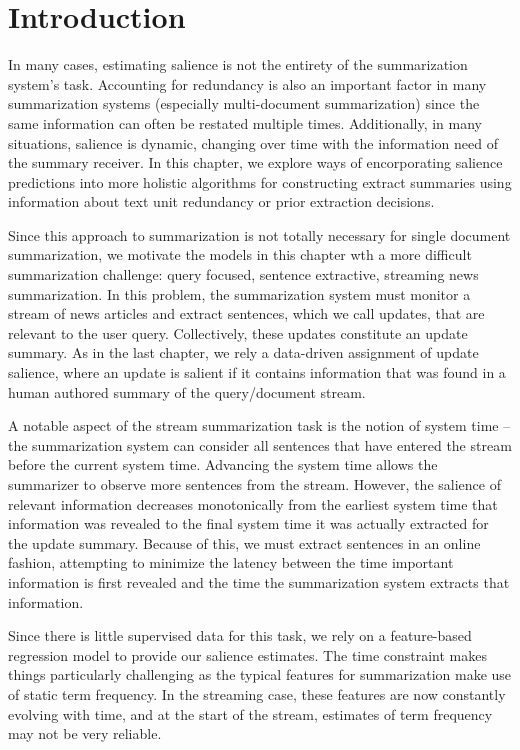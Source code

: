 \section{Introduction}

In many cases, estimating salience is not the entirety of the summarization
system's task. Accounting for redundancy is also an important factor in many
summarization systems (especially multi-document summarization) since the same
information can often be restated multiple times. Additionally, in many
situations, salience is dynamic, changing over time with the information need
of the summary receiver.  In this chapter, we explore ways of encorporating
salience predictions into more holistic algorithms for constructing extract
summaries using information about text unit redundancy or prior extraction
decisions.  

Since this approach to summarization is not totally necessary for single
document summarization, we motivate the models in this chapter wth a more
difficult summarization challenge: query focused, sentence extractive,
streaming news summarization.  In this problem, the summarization system must
monitor a stream of news articles and extract sentences, which we call
updates, that are relevant to the user query. Collectively, these updates
constitute an update summary.  As in the last chapter, we rely a data-driven
assignment of update salience, where an update is salient if it contains
information that was found in a human authored summary of the query/document
stream. 

A notable aspect of the stream summarization task is the notion of system time
-- the summarization system can consider all sentences that have entered the
stream before the current system time. Advancing the system time allows the
summarizer to observe more sentences from the stream. However, the salience of
relevant information decreases monotonically from the earliest system time
that information was revealed to the final system time it was actually
extracted for the update summary.  Because of this, we must extract sentences
in an online fashion, attempting to minimize the latency between the time
important information is first revealed and the time the summarization system
extracts that information.

Since there is little supervised data for this task, we rely on a
feature-based regression model to provide our salience estimates.   The time
constraint makes things particularly challenging as the typical features for
summarization make use of static term frequency.  In the streaming case, these
features are now constantly evolving with time, and at the start of the
stream, estimates of term frequency may not be very reliable. 

